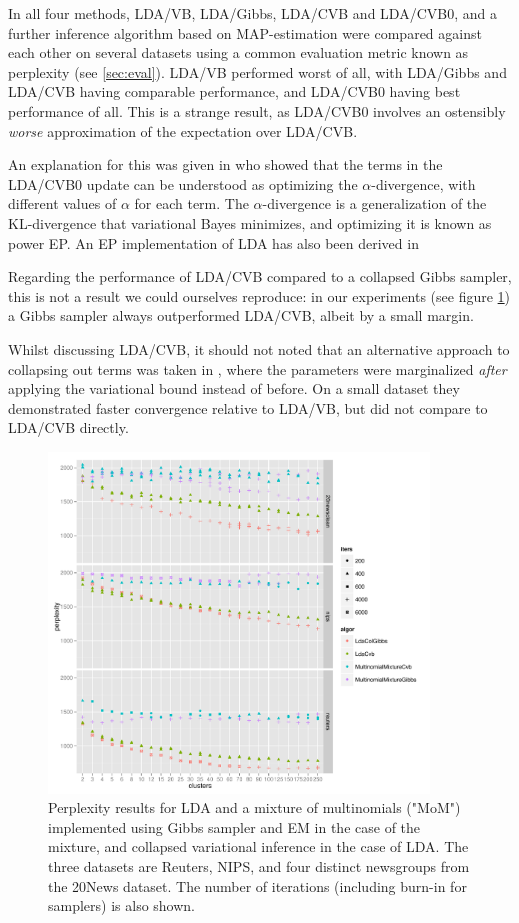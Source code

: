 In \cite{Asuncion2012} all four methods, LDA/VB, LDA/Gibbs, LDA/CVB and LDA/CVB0, and a further inference algorithm based on MAP-estimation were compared against each other on several datasets using a common evaluation metric known as perplexity (see \ref{sec:eval}). LDA/VB performed worst of all, with LDA/Gibbs and LDA/CVB having comparable performance, and LDA/CVB0 having best performance of all. This is a strange result, as LDA/CVB0 involves an ostensibly \emph{worse} approximation of the expectation over LDA/CVB. 

An explanation for this was given in\cite{Sato2012} who showed that the terms in the LDA/CVB0 update can be understood as optimizing the $\alpha$-divergence\cite{Minka2005}, with different values of $\alpha$ for each term. The $\alpha$-divergence is a generalization of the KL-divergence that variational Bayes minimizes, and optimizing it is known as power EP. An EP implementation of LDA has also been derived in \cite{Minka2002}

Regarding the performance of LDA/CVB compared to a collapsed Gibbs sampler, this is not a result we could ourselves reproduce: in our experiments (see figure \ref{fig:nip-reuters-20news-tests}) a Gibbs sampler always outperformed LDA/CVB, albeit by a small margin.

Whilst discussing LDA/CVB, it should not noted that an alternative approach to collapsing out terms was taken in \cite{Hensman2012}, where the parameters were marginalized \emph{after} applying the variational bound instead of before. On a small dataset they demonstrated faster convergence relative to LDA/VB, but did not compare to LDA/CVB directly.


\begin{figure}
  \centering
    \includegraphics[width=0.9\textwidth]{plots/results-2013-03-18.pdf}
  \caption{Perplexity results for LDA and a mixture of multinomials ("MoM") implemented using Gibbs sampler and EM in the case of the mixture, and collapsed variational inference in the case of LDA. The three datasets are Reuters, NIPS, and four distinct newsgroups from the 20News dataset. The number of iterations (including burn-in for samplers) is also shown.}
  \label{fig:nip-reuters-20news-tests}
\end{figure}

